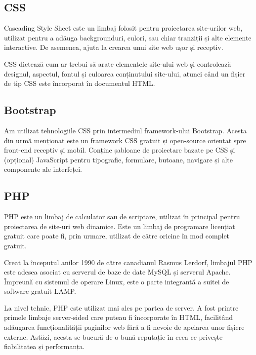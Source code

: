 \documentclass[12pt,a4paper]{report}
\begin{document}
\subsection{CSS}
\par
Cascading Style Sheet este un limbaj folosit pentru proiectarea site-urilor web, utilizat pentru a adăuga backgrounduri, culori, sau chiar tranziții și alte elemente interactive. De asemenea, ajuta la crearea unui site web ușor și receptiv.
\\\par 
CSS dictează cum ar trebui să arate elementele site-ului web și controlează designul, aspectul, fontul și culoarea conținutului site-ului, atunci când un fișier de tip CSS este încorporat în documentul HTML.

\subsection{Bootstrap}
\par
Am utilizat tehnologiile CSS prin intermediul framework-ului Bootstrap. Acesta din urmă menționat este un framework CSS gratuit și open-source orientat spre front-end receptiv și mobil. Conține șabloane de proiectare bazate pe CSS și (opțional) JavaScript pentru tipografie, formulare, butoane, navigare și alte componente ale interfeței.
\subsection{PHP}
\par
PHP este un limbaj de calculator sau de scriptare, utilizat în principal pentru proiectarea de site-uri web dinamice. Este un limbaj de programare licențiat gratuit care poate fi, prin urmare, utilizat de către oricine în mod complet gratuit.
\\\par 
Creat la începutul anilor 1990 de către canadianul Rasmus Lerdorf, limbajul PHP este adesea asociat cu serverul de baze de date MySQL și serverul Apache. Împreună cu sistemul de operare Linux, este o parte integrantă a suitei de software gratuit LAMP.
\\\par 
La nivel tehnic, PHP este utilizat mai ales pe partea de server. A fost printre primele limbaje server-sided care puteau fi încorporate în HTML, facilitând adăugarea funcționalității paginilor web fără a fi nevoie de apelarea unor fișiere externe. Astăzi, acesta se bucură de o bună reputație în ceea ce privește fiabilitatea și performanța.
\end{document}
